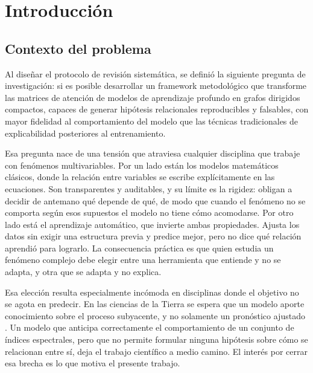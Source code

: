 
\chapter{Introducción}

\section{Contexto del problema}

Al diseñar el protocolo de revisión sistemática, se definió la siguiente pregunta de investigación: si es posible desarrollar un framework metodológico que transforme las matrices de atención de modelos de aprendizaje profundo en grafos dirigidos compactos, capaces de generar hipótesis relacionales reproducibles y falsables, con mayor fidelidad al comportamiento del modelo que las técnicas tradicionales de explicabilidad posteriores al entrenamiento.

Esa pregunta nace de una tensión que atraviesa cualquier disciplina que trabaje con fenómenos multivariables. Por un lado están los modelos matemáticos clásicos, donde la relación entre variables se escribe explícitamente en las ecuaciones. Son transparentes y auditables, y su límite es la rigidez: obligan a decidir de antemano qué depende de qué, de modo que cuando el fenómeno no se comporta según esos supuestos el modelo no tiene cómo acomodarse. Por otro lado está el aprendizaje automático, que invierte ambas propiedades. Ajusta los datos sin exigir una estructura previa y predice mejor, pero no dice qué relación aprendió para lograrlo. La consecuencia práctica es que quien estudia un fenómeno complejo debe elegir entre una herramienta que entiende y no se adapta, y otra que se adapta y no explica.

Esa elección resulta especialmente incómoda en disciplinas donde el objetivo no se agota en predecir. En las ciencias de la Tierra se espera que un modelo aporte conocimiento sobre el proceso subyacente, y no solamente un pronóstico ajustado \cite{reichstein2019deep}. Un modelo que anticipa correctamente el comportamiento de un conjunto de índices espectrales, pero que no permite formular ninguna hipótesis sobre cómo se relacionan entre sí, deja el trabajo científico a medio camino. El interés por cerrar esa brecha es lo que motiva el presente trabajo.

